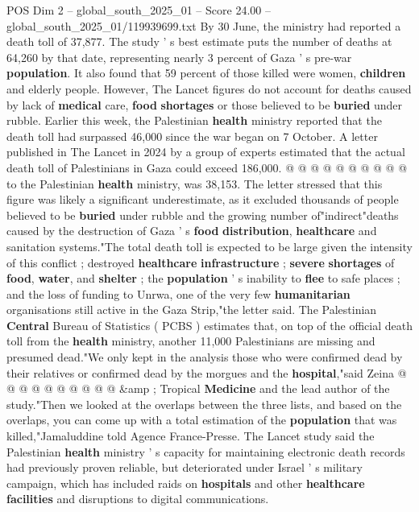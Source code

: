 \begin{textsample}{POS Dim 2 – global\_south\_2025\_01 – Score 24.00 – global\_south\_2025\_01/119939699.txt}
By 30 June, the ministry had reported a death toll of 37,877.
The study ' s best estimate puts the number of deaths at 64,260 by that date, representing nearly 3 percent of Gaza ' s pre-war \textbf{population}.
It also found that 59 percent of those killed were women, \textbf{children} and elderly people.
However, The Lancet figures do not account for deaths caused by lack of \textbf{medical} care, \textbf{food} \textbf{shortages} or those believed to be \textbf{buried} under rubble.
Earlier this week, the Palestinian \textbf{health} ministry reported that the death toll had surpassed 46,000 since the war began on 7 October.
A letter published in The Lancet in 2024 by a group of experts estimated that the actual death toll of Palestinians in Gaza could exceed 186,000. @ @ @ @ @ @ @ @ @ @ to the Palestinian \textbf{health} ministry, was 38,153.
The letter stressed that this figure was likely a significant underestimate, as it excluded thousands of people believed to be \textbf{buried} under rubble and the growing number of"indirect"deaths caused by the destruction of Gaza ' s \textbf{food} \textbf{distribution}, \textbf{healthcare} and sanitation systems."The total death toll is expected to be large given the intensity of this conflict ; destroyed \textbf{healthcare} \textbf{infrastructure} ; \textbf{severe} \textbf{shortages} of \textbf{food}, \textbf{water}, and \textbf{shelter} ; the \textbf{population} ' s inability to \textbf{flee} to safe places ; and the loss of funding to Unrwa, one of the very few \textbf{humanitarian} organisations still active in the Gaza Strip,"the letter said.
The Palestinian \textbf{Central} Bureau of Statistics ( PCBS ) estimates that, on top of the official death toll from the \textbf{health} ministry, another 11,000 Palestinians are missing and presumed dead."We only kept in the analysis those who were confirmed dead by their relatives or confirmed dead by the morgues and the \textbf{hospital},"said Zeina @ @ @ @ @ @ @ @ @ @ \&amp ; Tropical \textbf{Medicine} and the lead author of the study."Then we looked at the overlaps between the three lists, and based on the overlaps, you can come up with a total estimation of the \textbf{population} that was killed,"Jamaluddine told Agence France-Presse.
The Lancet study said the Palestinian \textbf{health} ministry ' s capacity for maintaining electronic death records had previously proven reliable, but deteriorated under Israel ' s military campaign, which has included raids on \textbf{hospitals} and other \textbf{healthcare} \textbf{facilities} and disruptions to digital communications.

\end{textsample}
